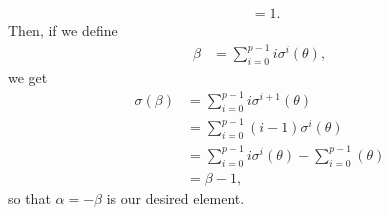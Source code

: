 \documentclass[10pt]{mypackage}
\begin{document}
\begin{solution}
\begin{enumerate}[(a)]
\begin{align*}
                                 &= 1.
      \end{align*}
      Then, if we define
      \begin{align*}
        \beta &= \sum_{i=0}^{p-1} i\sigma^{i}\left( \theta \right),
      \end{align*}
      we get
      \begin{align*}
        \sigma\left( \beta \right) &= \sum_{i=0}^{p-1} i\sigma^{i+1}\left( \theta \right)\\
                                    &= \sum_{i=0}^{p-1} \left( i-1 \right)\sigma^{i}\left( \theta \right)\\
                                    &= \sum_{i=0}^{p-1} i\sigma^{i}\left( \theta \right) - \sum_{i=0}^{p-1}\left( \theta \right)\\
                                    &= \beta - 1,
      \end{align*}
      so that $\alpha = -\beta$ is our desired element.
  \end{enumerate}
\end{solution}
\end{document}
